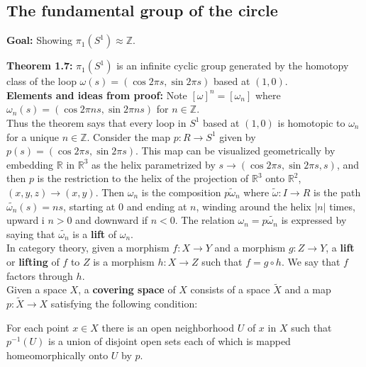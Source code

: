 \documentclass[a4paper]{article}
\begin{document}
\subsection*{The fundamental group of the circle}
\begin{center}
    \textbf{Goal:} Showing $\pi_1 (S^{1}) \approx \mathbb{Z}$.
\end{center}
\textbf{Theorem 1.7:} $\pi_1 \left( S^{1} \right) $ is an infinite cyclic group
generated by the homotopy class of the loop 
$\omega (s) = \left( \cos 2\pi s, \sin 2 \pi s \right) $ based at $(1,0)$.\\
\linebreak
\textbf{Elements and ideas from proof:} Note
$\left[ \omega  \right]^{n} = \left[ \omega_n \right] $ where
$\omega_n (s) = \left( \cos 2 \pi n s, \sin 2 \pi n s \right) $ for $n \in
\mathbb{Z}$.\\
Thus the theorem says that every loop in $S^{1}$ based at $(1,0)$ is homotopic
to $\omega_n$ for a unique $n \in \mathbb{Z}$. Consider the
map $p \colon R \to S^{1}$ given by $p (s) = \left( \cos 2 \pi s, \sin 2 \pi
s \right) $.
This map can be visualized geometrically by embedding $\mathbb{R}$ in
$\mathbb{R}^3$ as the helix parametrized by
$s \to \left( \cos 2\pi s, \sin 2 \pi s, s \right) $, and then $p$ is the
restriction to the helix of the projection of $\mathbb{R}^3$ onto
$\mathbb{R}^2$,
$\left( x,y,z \right) \to \left( x,y \right) $. Then
$\omega_n$ is the composition $p \tilde{\omega}_n$ where $\tilde{\omega}
\colon I \to R$ is the path $\tilde{\omega_n}(s) = ns$, starting at $0$ and
ending at $n$, winding around the helix $|n|$ times, upward i $n>0$ and
downward if $n<0$. The relation $\omega_n = p \tilde{\omega_n}$ is expressed by
saying that $\tilde{\omega_n}$ is a \textbf{lift} of $\omega_n$.\\
\linebreak
In category theory, given a morphism $f \colon X \to Y$ and a morphism $g
\colon Z \to Y$, a \textbf{lift} or \textbf{lifting} of $f$ to $Z$ is
a morphism
$h  \colon X \to Z$ such that $f = g \circ h$. We say that $f$ factors through
$h$.\\
\linebreak
Given a space $X$, a \textbf{covering space} of $X$ consists of a space
$\tilde{X}$ and a map $p  \colon \tilde{X} \to X$ satisfying the following
condition:\\
\begin{center}
    For each point $x \in X$ there is an open neighborhood $U$ of $x$ in $X$ 
    such that $p^{-1}\left( U \right) $ is a union of disjoint open sets each
    of which is mapped homeomorphically onto $U$ by $p$.
\end{center}
\end{document}
